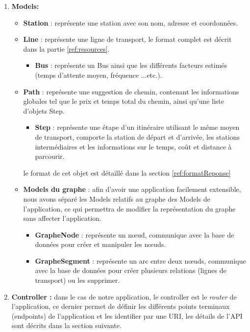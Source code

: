 \begin{enumerate}
	\item \textbf{Models:}
	      \begin{itemize}
	      	\item \textbf{Station} : représente une station avec son nom, adresse et coordonnées.
	      	\item \textbf{Line} : représente une ligne de transport, le format complet est décrit dans la partie \ref{ref:resources}.
	      	      \begin{itemize}
	      	      	\item \textbf{Bus} : représente un Bus ainsi que les différents facteurs estimés (temps d'attente moyen, fréquence ...etc.).
	      	      \end{itemize}
	      	\item \textbf{Path} : représente une suggestion de chemin, contenant les informations globales tel que le prix et temps total du chemin, ainsi qu'une liste d'objets Step.
	      	      \begin{itemize}
	      	      	\item \textbf{Step} : représente une étape d'un itinéraire utilisant le même moyen de transport, comporte la station de départ et d'arrivée, les stations intermédiaires et les informations sur le temps, coût et distance à parcourir.
	      	      \end{itemize}
	      	      le format de cet objet est détaillé dans la section \ref{ref:formatReponse}
	      	\item \textbf{Models du graphe} : 
	      	      afin d'avoir une application facilement extensible, nous avons séparé les Models relatifs au graphe des Models de l'application, ce qui permettra de modifier la représentation du graphe sans affecter l'application.
	      	      \begin{itemize}
	      	      	\item \textbf{GrapheNode} : représente un nœud, communique avec la base de données pour créer et manipuler les nœuds.
	      	      	\item \textbf{GrapheSegment} : représente un arc entre deux nœuds, communique avec la base de données pour créer plusieurs relations (lignes de transport) ou les supprimer.
	      	      \end{itemize}
	      \end{itemize}
	      	
	\item \textbf{Controller :} dans le cas de notre application, le controller est le \emph{router} de l'application, ce dernier permet de définir les différents points terminaux (endpoints) de l'application et les identifier par une URI, les détails de l'API sont décrits dans la section suivante.
	     	      	

\end{enumerate}
